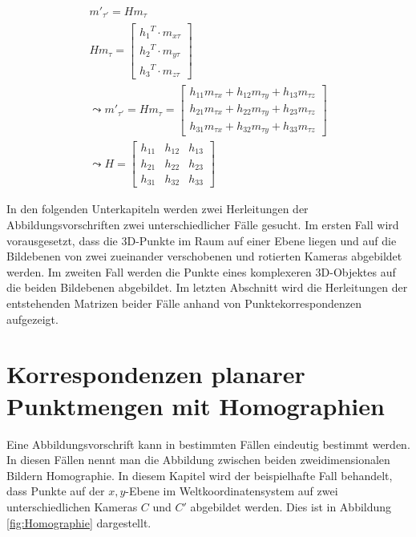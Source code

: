 \begin{gather}
	m'_{\tau'} = Hm_{\tau}\\
	Hm_{\tau} = \begin{bmatrix}
		{h_1}^T \cdot m_{x \tau}\\{h_2}^T \cdot m_{y \tau}\\{h_3}^T \cdot m_{z \tau}
	\end{bmatrix} \\
	\leadsto 
	m'_{\tau'}= Hm_{\tau}= \begin{bmatrix}
		h_{11}m_{\tau x}+h_{12}m_{\tau y}+h_{13}m_{\tau z}\\
		h_{21}m_{\tau x}+h_{22}m_{\tau y}+h_{23}m_{\tau z}\\
		h_{31}m_{\tau x}+h_{32}m_{\tau y}+h_{33}m_{\tau z}
	\end{bmatrix}\\
	\leadsto 
	H=\begin{bmatrix}
		h_{11}&h_{12}&h_{13}\\
		h_{21}&h_{22}&h_{23}\\
		h_{31}&h_{32}&h_{33}
	\end{bmatrix}
\end{gather}


In den folgenden Unterkapiteln werden zwei Herleitungen der Abbildungsvorschriften zwei unterschiedlicher Fälle gesucht. Im ersten Fall wird vorausgesetzt, dass die 3D-Punkte im Raum auf einer Ebene liegen und auf die Bildebenen von zwei zueinander verschobenen und rotierten Kameras abgebildet werden. Im zweiten Fall werden die Punkte eines komplexeren 3D-Objektes auf die beiden Bildebenen abgebildet. Im letzten Abschnitt wird die Herleitungen der entstehenden Matrizen beider Fälle anhand von Punktekorrespondenzen aufgezeigt. 


\section{Korrespondenzen planarer Punktmengen mit Homographien}

Eine Abbildungsvorschrift kann in bestimmten Fällen eindeutig bestimmt werden. In diesen Fällen nennt man die Abbildung zwischen beiden zweidimensionalen Bildern Homographie\cite{HZ,Elements,Roser}. In diesem Kapitel wird der beispielhafte Fall behandelt, dass Punkte auf der $x,y$-Ebene im Weltkoordinatensystem auf zwei unterschiedlichen Kameras $C$ und $C'$ abgebildet werden. Dies ist in Abbildung \ref{fig:Homographie} dargestellt.
\pagebreak


